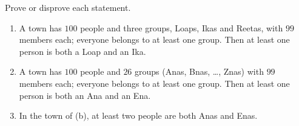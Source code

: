 Prove or disprove each statement.
\begin{enumerate}
\item[(a)] A town has $100$ people and three groups, Loaps, Ikas and Reetas, with $99$ members each; everyone belongs to at least one group. Then at least one person is both a Loap and an Ika.
\item[(b)] A town has $100$ people and $26$ groups (Anas, Bnas, \dots, Znas) with $99$ members each; everyone belongs to at least one group. Then at least one person is both an Ana and an Ena.
\item[(c)] In the town of (b), at least two people are both Anas and Enas.
\end{enumerate}

